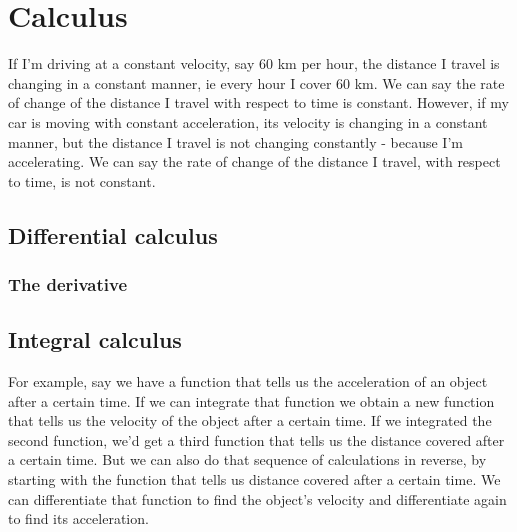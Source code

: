 \chapter{Calculus}

If I'm driving at a constant velocity, say 60 km per hour, the distance I travel is changing in a constant manner, ie every hour I cover 60 km. We can say the rate of change of the distance I travel with respect to time is constant. However, if my car is moving with constant acceleration, its velocity is changing in a constant manner, but the distance I travel is not changing constantly - because I'm accelerating. We can say the rate of change of the distance I travel, with respect to time, is not constant.

\section{Differential calculus}

\subsection{The derivative}

\section{Integral calculus}
For example, say we have a function that tells us the acceleration of an object after a certain time. If we can integrate that function we obtain a new function that tells us the velocity of the object after a certain time. If we integrated the second function, we'd get a third function that tells us the distance covered after a certain time. But we can also do that sequence of calculations in reverse, by starting with the function that tells us distance covered after a certain time. We can differentiate that function to find the object's velocity and differentiate again to find its acceleration.

